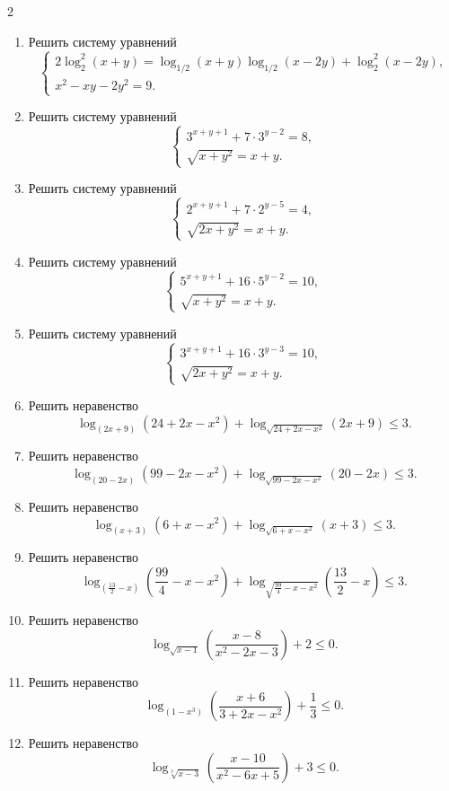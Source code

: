 \documentclass[14pt,a4paper,landscape]{article}
\begin{document}
\begin{multicols}{2}
\begin{enumerate}[label=3.\arabic*, leftmargin=1.5em]
$$    $$
    \item Решить систему уравнений
    $$
    \begin{cases}
    2\log_2^2(x+y) = \log_{1/2}(x+y)\log_{1/2}(x-2y) + \log_2^2(x-2y), \\
    x^2-xy-2y^2=9.
    \end{cases}
    $$
    \item Решить систему уравнений
    $$
    \begin{cases}
    3^{x+y+1} + 7 \cdot 3^{y-2} = 8, \\
    \sqrt{x+y^2} = x+y.
    \end{cases}
    $$
    \item Решить систему уравнений
    $$
    \begin{cases}
    2^{x+y+1} + 7 \cdot 2^{y-5} = 4, \\
    \sqrt{2x+y^2} = x+y.
    \end{cases}
    $$
    \item Решить систему уравнений
    $$
    \begin{cases}
    5^{x+y+1} + 16 \cdot 5^{y-2} = 10, \\
    \sqrt{x+y^2} = x+y.
    \end{cases}
    $$
    \item Решить систему уравнений
    $$
    \begin{cases}
    3^{x+y+1} + 16 \cdot 3^{y-3} = 10, \\
    \sqrt{2x+y^2} = x+y.
    \end{cases}
    $$
    \item Решить неравенство $$\log_{(2x+9)}(24+2x-x^2) + \log_{\sqrt{24+2x-x^2}}(2x+9) \leqslant 3.$$
    \item Решить неравенство $$\log_{(20-2x)}(99-2x-x^2) + \log_{\sqrt{99-2x-x^2}}(20-2x) \leqslant 3.$$
    \item Решить неравенство $$\log_{(x+3)}(6+x-x^2) + \log_{\sqrt{6+x-x^2}}(x+3) \leqslant 3.$$
    \item Решить неравенство $$\log_{\left(\frac{13}{2}-x\right)}\left(\frac{99}{4}-x-x^2\right) + \log_{\sqrt{\frac{99}{4}-x-x^2}}\left(\frac{13}{2}-x\right) \leqslant 3.$$
    \item Решить неравенство $$\log_{\sqrt{x-1}}\left(\frac{x-8}{x^2-2x-3}\right) + 2 \leqslant 0.$$
    \item Решить неравенство $$\log_{(1-x^3)}\left(\frac{x+6}{3+2x-x^2}\right) + \frac{1}{3} \leqslant 0.$$
    \item Решить неравенство $$\log_{\sqrt[3]{x-3}}\left(\frac{x-10}{x^2-6x+5}\right) + 3 \leqslant 0.$$

\end{enumerate}
\end{multicols}
\end{document}

